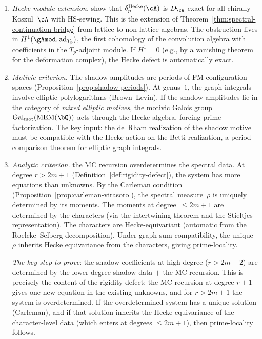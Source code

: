 \begin{remark}%
\label{rem:prime-locality-routes}%
%
\mbox{}
\begin{enumerate}[label=\textup{(\Alph*)}]
\item \emph{Hecke module extension.}
 show that $\delta_p^{\mathrm{Hecke}}(\cA)$ is
 $D_\cA$-exact for all chirally Koszul~$\cA$ with HS-sewing.
 This is the extension of
 Theorem~\ref{thm:spectral-continuation-bridge} from
 lattice to non-lattice algebras.
 The obstruction lives in
 $H^1(\gAmod, \mathrm{ad}_{T_p})$, the first cohomology
 of the convolution algebra with coefficients in the
 $T_p$-adjoint module. If $H^1 = 0$
 (e.g., by a vanishing theorem for the deformation complex),
 the Hecke defect is automatically exact.

\item \emph{Motivic criterion.} The shadow amplitudes are
 periods of FM configuration spaces
 (Proposition~\ref{prop:shadow-periods}).
 At genus~$1$, the graph integrals involve elliptic
 polylogarithms (Brown--Levin). If the shadow amplitudes
 lie in the category of \emph{mixed elliptic motives}, the
 motivic Galois group
 $\mathrm{Gal}_{\mathrm{mot}}(\mathrm{MEM}(\bQ))$
 acts through the Hecke algebra, forcing prime factorization.
 The key input: the de~Rham realization of the shadow
 motive must be compatible with the Hecke action on
 the Betti realization, a period comparison theorem for
 elliptic graph integrals.

\item \emph{Analytic criterion.}
 the MC recursion overdetermines the spectral data.
 At degree $r > 2m{+}1$
 (Definition~\ref{def:rigidity-defect}),
 the system has more equations than unknowns.
 By the Carleman condition
 (Proposition~\ref{prop:carleman-virasoro}), the spectral
 measure~$\rho$ is uniquely determined by its moments.
 The moments at degree~$\le 2m{+}1$ are determined by the
 characters (via the intertwining theorem and the
 Stieltjes representation). The characters are
 Hecke-equivariant (automatic from the Roelcke--Selberg
decomposition). Under graph-sum compatibility, the unique~$\rho$ inherits
 Hecke equivariance from the characters, giving
 prime-locality.

 \emph{The key step to prove}: the shadow coefficients at
 high degree ($r > 2m{+}2$) are determined by the
 lower-degree shadow data $+$ the MC recursion. This is
 precisely the content of the rigidity defect: the
 MC recursion at degree $r{+}1$ gives one new equation
 in the existing unknowns, and for $r > 2m{+}1$ the
 system is overdetermined. If the overdetermined system
 has a unique solution (Carleman), and if that solution
 inherits the Hecke equivariance of the character-level
 data (which enters at degrees $\le 2m{+}1$), then
 prime-locality follows.


\end{enumerate}
\end{remark}
